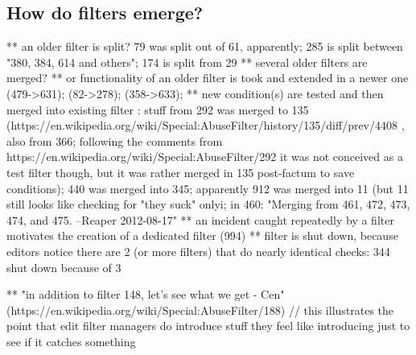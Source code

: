 \subsection{How do filters emerge?}
  ** an older filter is split? 79 was split out of 61, apparently; 285 is split between "380, 384, 614 and others"; 174 is split from 29
  ** several older filters are merged?
  ** or functionality of an older filter is took and extended in a newer one (479->631); (82->278); (358->633);
  ** new condition(s) are tested and then merged into existing filter : stuff from 292 was merged to 135 (https://en.wikipedia.org/wiki/Special:AbuseFilter/history/135/diff/prev/4408 , also from 366; following the comments from https://en.wikipedia.org/wiki/Special:AbuseFilter/292 it was not conceived as a test filter though, but it was rather merged in 135 post-factum to save conditions); 440 was merged into 345; apparently 912 was merged into 11 (but 11 still looks like checking for "they suck" only^^); in 460: "Merging from 461, 472, 473, 474, and 475. --Reaper 2012-08-17"
  ** an incident caught repeatedly by a filter motivates the creation of a dedicated filter (994)
  ** filter is shut down, because editors notice there are 2 (or more filters) that do nearly identical checks: 344 shut down because of 3

  ** "in addition to filter 148, let's see what we get - Cen" (https://en.wikipedia.org/wiki/Special:AbuseFilter/188) // this illustrates the point that edit filter managers do introduce stuff they feel like introducing just to see if it catches something

